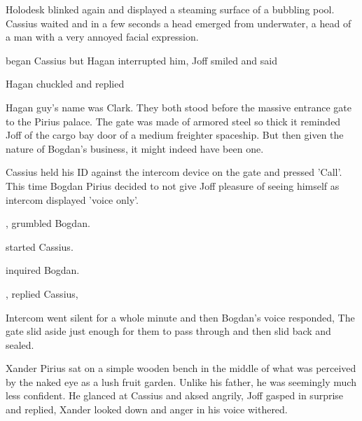  Holodesk blinked again and displayed a steaming surface of a bubbling pool. Cassius waited and in a few seconds a head emerged from underwater, a head of a man with a very annoyed facial expression.

 began Cassius but Hagan interrupted him,  Joff smiled and said 

Hagan chuckled and replied 

Hagan guy's name was Clark. They both stood before the massive entrance gate to the Pirius palace. The gate was made of armored steel so thick it reminded Joff of the cargo bay door of a medium freighter spaceship. But then given the nature of Bogdan's business, it might indeed have been one.

Cassius held his ID against the intercom device on the gate and pressed 'Call'. This time Bogdan Pirius decided to not give Joff pleasure of seeing himself as intercom displayed 'voice only'.

, grumbled Bogdan.

 started Cassius.

 inquired Bogdan.

, replied Cassius, 

Intercom went silent for a whole minute and then Bogdan's voice responded,  The gate slid aside just enough for them to pass through and then slid back and sealed.

Xander Pirius sat on a simple wooden bench in the middle of what was perceived by the naked eye as a lush fruit garden. Unlike his father, he was seemingly much less confident. He glanced at Cassius and aksed angrily,  Joff gasped in surprise and replied,  Xander looked down and anger in his voice withered.

